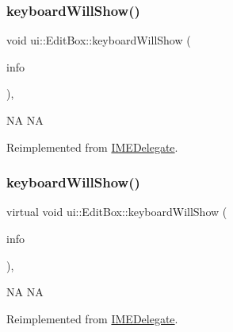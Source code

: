 \subsubsection{\texorpdfstring{keyboard\+Will\+Show()}{keyboardWillShow()}\hspace{0.1cm}{\footnotesize\ttfamily [1/2]}}
{\footnotesize\ttfamily void ui\+::\+Edit\+Box\+::keyboard\+Will\+Show (\begin{DoxyParamCaption}\item[{\hyperlink{structIMEKeyboardNotificationInfo}{I\+M\+E\+Keyboard\+Notification\+Info} \&}]{info }\end{DoxyParamCaption})\hspace{0.3cm}{\ttfamily [override]}, {\ttfamily [virtual]}}

NA  NA 

Reimplemented from \hyperlink{classIMEDelegate_ac9f4511548c15f58087d48bcb8cedbfc}{I\+M\+E\+Delegate}.

\mbox{\label{classui_1_1EditBox_a5913b44adaf000a76cf35a126fbdeb31}} 
\subsubsection{\texorpdfstring{keyboard\+Will\+Show()}{keyboardWillShow()}\hspace{0.1cm}{\footnotesize\ttfamily [2/2]}}
{\footnotesize\ttfamily virtual void ui\+::\+Edit\+Box\+::keyboard\+Will\+Show (\begin{DoxyParamCaption}\item[{\hyperlink{structIMEKeyboardNotificationInfo}{I\+M\+E\+Keyboard\+Notification\+Info} \&}]{info }\end{DoxyParamCaption})\hspace{0.3cm}{\ttfamily [override]}, {\ttfamily [virtual]}}

NA  NA 

Reimplemented from \hyperlink{classIMEDelegate_ac9f4511548c15f58087d48bcb8cedbfc}{I\+M\+E\+Delegate}.

\mbox{\label{classui_1_1EditBox_afe94af506888eab257504bf408b5692d}} 
